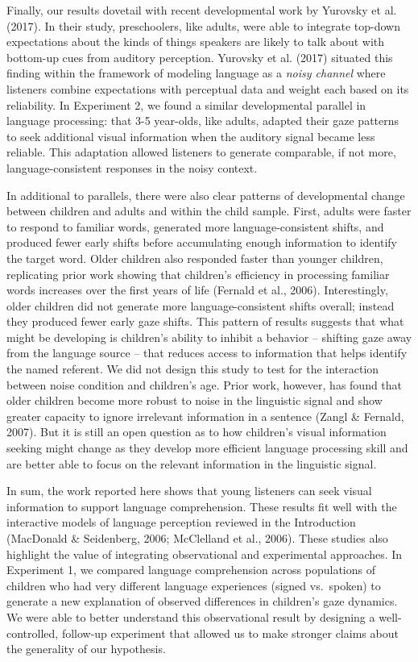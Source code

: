 \documentclass[,man,floatsintext]{apa6}
\begin{document}
Finally, our results dovetail with recent developmental work by Yurovsky
et al. (2017). In their study, preschoolers, like adults, were able to
integrate top-down expectations about the kinds of things speakers are
likely to talk about with bottom-up cues from auditory perception.
Yurovsky et al. (2017) situated this finding within the framework of
modeling language as a \emph{noisy channel} where listeners combine
expectations with perceptual data and weight each based on its
reliability. In Experiment 2, we found a similar developmental parallel
in language processing: that 3-5 year-olds, like adults, adapted their
gaze patterns to seek additional visual information when the auditory
signal became less reliable. This adaptation allowed listeners to
generate comparable, if not more, language-consistent responses in the
noisy context.

In additional to parallels, there were also clear patterns of
developmental change between children and adults and within the child
sample. First, adults were faster to respond to familiar words,
generated more language-consistent shifts, and produced fewer early
shifts before accumulating enough information to identify the target
word. Older children also responded faster than younger children,
replicating prior work showing that children's efficiency in processing
familiar words increases over the first years of life (Fernald et al.,
2006). Interestingly, older children did not generate more
language-consistent shifts overall; instead they produced fewer early
gaze shifts. This pattern of results suggests that what might be
developing is children's ability to inhibit a behavior -- shifting gaze
away from the language source -- that reduces access to information that
helps identify the named referent. We did not design this study to test
for the interaction between noise condition and children's age. Prior
work, however, has found that older children become more robust to noise
in the linguistic signal and show greater capacity to ignore irrelevant
information in a sentence (Zangl \& Fernald, 2007). But it is still an
open question as to how children's visual information seeking might
change as they develop more efficient language processing skill and are
better able to focus on the relevant information in the linguistic
signal.

In sum, the work reported here shows that young listeners can seek
visual information to support language comprehension. These results fit
well with the interactive models of language perception reviewed in the
Introduction (MacDonald \& Seidenberg, 2006; McClelland et al., 2006).
These studies also highlight the value of integrating observational and
experimental approaches. In Experiment 1, we compared language
comprehension across populations of children who had very different
language experiences (signed vs.~spoken) to generate a new explanation
of observed differences in children's gaze dynamics. We were able to
better understand this observational result by designing a
well-controlled, follow-up experiment that allowed us to make stronger
claims about the generality of our hypothesis.
\end{document}
